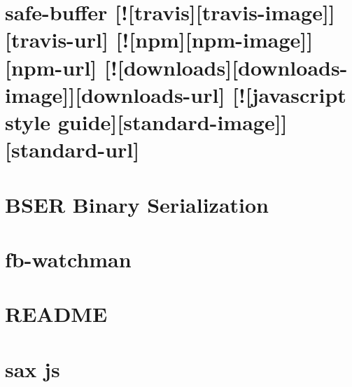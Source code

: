 \documentclass[twoside]{book}
\newcommand{\+}{\discretionary{\mbox{\scriptsize$\hookleftarrow$}}{}{}}
\begin{document}
\chapter{safe-\/buffer \mbox{[}!\mbox{[}travis\mbox{]}\mbox{[}travis-\/image\mbox{]}\mbox{]}\mbox{[}travis-\/url\mbox{]} \mbox{[}!\mbox{[}npm\mbox{]}\mbox{[}npm-\/image\mbox{]}\mbox{]}\mbox{[}npm-\/url\mbox{]} \mbox{[}!\mbox{[}downloads\mbox{]}\mbox{[}downloads-\/image\mbox{]}\mbox{]}\mbox{[}downloads-\/url\mbox{]} \mbox{[}!\mbox{[}javascript style guide\mbox{]}\mbox{[}standard-\/image\mbox{]}\mbox{]}\mbox{[}standard-\/url\mbox{]}}
\label{md__c_1_workspace_demo_src_main_script_node_modules_safe-buffer__r_e_a_d_m_e}

\chapter{B\+S\+ER Binary Serialization}
\label{md__c_1_workspace_demo_src_main_script_node_modules_sane_node_modules_bser__r_e_a_d_m_e}

\chapter{fb-\/watchman}
\label{md__c_1_workspace_demo_src_main_script_node_modules_sane_node_modules_fb-watchman__r_e_a_d_m_e}

\chapter{R\+E\+A\+D\+ME}
\label{md__c_1_workspace_demo_src_main_script_node_modules_sane__r_e_a_d_m_e}

\chapter{sax js}
\label{md__c_1_workspace_demo_src_main_script_node_modules_sax__r_e_a_d_m_e}

\end{document}
